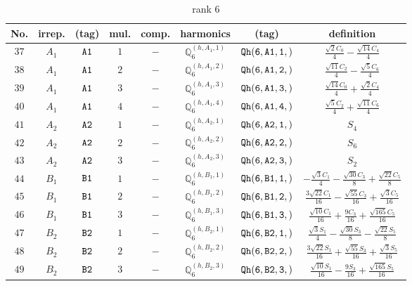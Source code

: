 \documentclass[fleqn,8pt]{jsarticle}
\begin{document}
\begin{table}[ht!]
\begin{center}
\caption{rank 6}
\renewcommand{\arraystretch}{1.3}
\begin{tabular}{cccccccc} \hline \hline
No. & irrep. & (tag) & mul. & comp. & harmonics & (tag) & definition \\ \hline
$ 37 $ & $ A_{1} $ & $ {\tt A1} $ & $ 1 $ & $ - $ & $ \mathbb{Q}_{6}^{(h,A_{1},1)} $ & $ {\tt Qh(6,A1,1,)} $ & $ \frac{\sqrt{2} C_{0}}{4} - \frac{\sqrt{14} C_{4}}{4} $ \\
$ 38 $ & $ A_{1} $ & $ {\tt A1} $ & $ 2 $ & $ - $ & $ \mathbb{Q}_{6}^{(h,A_{1},2)} $ & $ {\tt Qh(6,A1,2,)} $ & $ \frac{\sqrt{11} C_{2}}{4} - \frac{\sqrt{5} C_{6}}{4} $ \\
$ 39 $ & $ A_{1} $ & $ {\tt A1} $ & $ 3 $ & $ - $ & $ \mathbb{Q}_{6}^{(h,A_{1},3)} $ & $ {\tt Qh(6,A1,3,)} $ & $ \frac{\sqrt{14} C_{0}}{4} + \frac{\sqrt{2} C_{4}}{4} $ \\
$ 40 $ & $ A_{1} $ & $ {\tt A1} $ & $ 4 $ & $ - $ & $ \mathbb{Q}_{6}^{(h,A_{1},4)} $ & $ {\tt Qh(6,A1,4,)} $ & $ \frac{\sqrt{5} C_{2}}{4} + \frac{\sqrt{11} C_{6}}{4} $ \\
$ 41 $ & $ A_{2} $ & $ {\tt A2} $ & $ 1 $ & $ - $ & $ \mathbb{Q}_{6}^{(h,A_{2},1)} $ & $ {\tt Qh(6,A2,1,)} $ & $ S_{4} $ \\
$ 42 $ & $ A_{2} $ & $ {\tt A2} $ & $ 2 $ & $ - $ & $ \mathbb{Q}_{6}^{(h,A_{2},2)} $ & $ {\tt Qh(6,A2,2,)} $ & $ S_{6} $ \\
$ 43 $ & $ A_{2} $ & $ {\tt A2} $ & $ 3 $ & $ - $ & $ \mathbb{Q}_{6}^{(h,A_{2},3)} $ & $ {\tt Qh(6,A2,3,)} $ & $ S_{2} $ \\
$ 44 $ & $ B_{1} $ & $ {\tt B1} $ & $ 1 $ & $ - $ & $ \mathbb{Q}_{6}^{(h,B_{1},1)} $ & $ {\tt Qh(6,B1,1,)} $ & $ - \frac{\sqrt{3} C_{1}}{4} - \frac{\sqrt{30} C_{3}}{8} + \frac{\sqrt{22} C_{5}}{8} $ \\
$ 45 $ & $ B_{1} $ & $ {\tt B1} $ & $ 2 $ & $ - $ & $ \mathbb{Q}_{6}^{(h,B_{1},2)} $ & $ {\tt Qh(6,B1,2,)} $ & $ \frac{3 \sqrt{22} C_{1}}{16} - \frac{\sqrt{55} C_{3}}{16} + \frac{\sqrt{3} C_{5}}{16} $ \\
$ 46 $ & $ B_{1} $ & $ {\tt B1} $ & $ 3 $ & $ - $ & $ \mathbb{Q}_{6}^{(h,B_{1},3)} $ & $ {\tt Qh(6,B1,3,)} $ & $ \frac{\sqrt{10} C_{1}}{16} + \frac{9 C_{3}}{16} + \frac{\sqrt{165} C_{5}}{16} $ \\
$ 47 $ & $ B_{2} $ & $ {\tt B2} $ & $ 1 $ & $ - $ & $ \mathbb{Q}_{6}^{(h,B_{2},1)} $ & $ {\tt Qh(6,B2,1,)} $ & $ \frac{\sqrt{3} S_{1}}{4} - \frac{\sqrt{30} S_{3}}{8} - \frac{\sqrt{22} S_{5}}{8} $ \\
$ 48 $ & $ B_{2} $ & $ {\tt B2} $ & $ 2 $ & $ - $ & $ \mathbb{Q}_{6}^{(h,B_{2},2)} $ & $ {\tt Qh(6,B2,2,)} $ & $ \frac{3 \sqrt{22} S_{1}}{16} + \frac{\sqrt{55} S_{3}}{16} + \frac{\sqrt{3} S_{5}}{16} $ \\
$ 49 $ & $ B_{2} $ & $ {\tt B2} $ & $ 3 $ & $ - $ & $ \mathbb{Q}_{6}^{(h,B_{2},3)} $ & $ {\tt Qh(6,B2,3,)} $ & $ \frac{\sqrt{10} S_{1}}{16} - \frac{9 S_{3}}{16} + \frac{\sqrt{165} S_{5}}{16} $ \\
 \hline \hline
\end{tabular}
\end{center}
\end{table}
\end{document}
